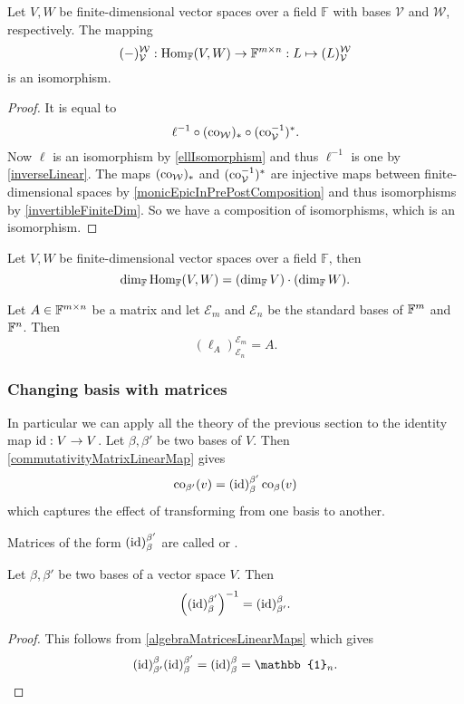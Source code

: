 \begin{proposition}
Let $V,W$ be finite-dimensional vector spaces over a field $\mathbb{F}$ with bases $\mathcal{V}$ and $\mathcal{W}$, respectively. The mapping
\[ (-)^{\mathcal{W}}_{\mathcal{V}}:\operatorname{Hom}_\mathbb{F}(V,W) \to \mathbb{F}^{m\times n}: L\mapsto (L)^{\mathcal{W}}_{\mathcal{V}} \]
is an isomorphism.
\end{proposition}
\begin{proof}
It is equal to
\[ \ell^{-1}\circ(\operatorname{co}_\mathcal{W})_*\circ(\operatorname{co}^{-1}_\mathcal{V})^*. \]
Now $\ell$ is an isomorphism by \ref{ellIsomorphism} and thus $\ell^{-1}$ is one by \ref{inverseLinear}. The maps $(\operatorname{co}_\mathcal{W})_*$ and $(\operatorname{co}^{-1}_\mathcal{V})^*$ are injective maps between finite-dimensional spaces by \ref{monicEpicInPrePostComposition} and thus isomorphisms by \ref{invertibleFiniteDim}.
So we have a composition of isomorphisms, which is an isomorphism.
\end{proof}
\begin{corollary}
Let $V,W$ be finite-dimensional vector spaces over a field $\mathbb{F}$, then
\[ \dim_{\mathbb{F}}\operatorname{Hom}_\mathbb{F}(V,W) = (\dim_{\mathbb{F}} V)\cdot (\dim_{\mathbb{F}} W). \] \label{dimHomset}
\end{corollary}

\begin{lemma}
Let $A\in\mathbb{F}^{m\times n}$ be a matrix and let $\mathcal{E}_m$ and $\mathcal{E}_n$ be the standard bases of $\mathbb{F}^m$ and $\mathbb{F}^n$. Then
\[ (\ell_{A})_{\mathcal{E}_n}^{\mathcal{E}_m} = A. \]
\end{lemma}

\subsubsection{Changing basis with matrices}
In particular we can apply all the theory of the previous section to the identity map $\operatorname{id}: V\to V$. Let $\beta, \beta'$ be two bases of $V$. Then \ref{commutativityMatrixLinearMap} gives
\[ \operatorname{co}_{\beta'}(v) = (\operatorname{id})_{\beta}^{\beta'}\operatorname{co}_\beta(v) \]
which captures the effect of transforming from one basis to another.
\begin{definition}
Matrices of the form $(\operatorname{id})_{\beta}^{\beta'}$ are called  or .
\end{definition}
\begin{lemma}
Let $\beta, \beta'$ be two bases of a vector space $V$. Then
\[ \left((\operatorname{id})_{\beta}^{\beta'}\right)^{-1} = (\operatorname{id})_{\beta'}^{\beta}. \]
\end{lemma}
\begin{proof}
This follows from \ref{algebraMatricesLinearMaps} which gives
\[ (\id)_{\beta'}^{\beta}(\id)_{\beta}^{\beta'} = (\id)_\beta^\beta = \mathbb{1}_n. \]
\end{proof}

